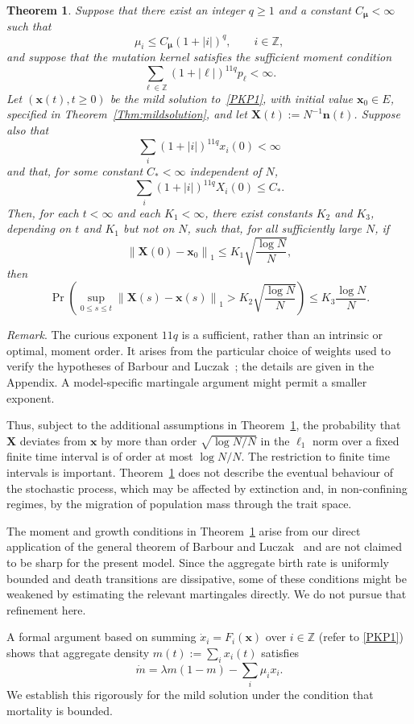 \documentclass[12pt]{article}
\newtheorem{theorem}{Theorem}
\newcommand{\Z}{\ensuremath{\mathbb Z}}
\newcommand{\bn}{\boldsymbol{n}}
\newcommand{\bX}{\boldsymbol{X}}
\newcommand{\bmu}{\boldsymbol{\mu}}
\newcommand{\norm}[1]{\left\lVert #1 \right\rVert}
\newcommand{\bx}{\boldsymbol{x}}
\begin{document}
\begin{theorem}
\label{BL}
Suppose that there exist an integer $q\geq1$ and a constant
$C_{\!\bmu}<\infty$ such that
\[
 \mu_i\leq C_{\!\bmu}(1+|i|)^q,\qquad i\in\mathbb Z,
\]
and suppose that the mutation kernel satisfies the sufficient
moment condition
\[
 \sum_{\ell\in\mathbb Z}(1+|\ell|)^{11q}p_\ell<\infty.
\]
Let $(\bx(t),t\geq0)$ be the mild solution to~\eqref{PKP1}, with
initial value $\bx_0\in E$, specified in
Theorem~\ref{Thm:mildsolution}, and let
$\bX(t):=N^{-1}\bn(t)$. Suppose also that
\[
 \sum_i(1+|i|)^{11q}x_i(0)<\infty
\]
and that, for some constant $C_*<\infty$ independent of $N$,
\[
 \sum_i(1+|i|)^{11q}X_i(0)\leq C_*.
\]
Then, for each $t<\infty$ and each $K_1<\infty$, there exist constants
$K_2$ and $K_3$, depending on $t$ and $K_1$ but not on $N$, such that, 
for all sufficiently large $N$, if
\[
 \norm{\bX(0)-\bx_0}_1
 \leq
 K_1\sqrt{\frac{\log N}{N}},
\]
then
\[
 \Pr\left(
 \sup_{0\leq s\leq t}
 \norm{\bX(s)-\bx(s)}_1
 >
 K_2\sqrt{\frac{\log N}{N}}
 \right)
 \leq
 K_3\frac{\log N}{N}.
\]
\end{theorem}

\medskip
\noindent
\emph{Remark}.
The curious exponent $11q$ is a sufficient, rather than an intrinsic
or optimal, moment order. It arises from the particular choice of
weights used to verify the hypotheses of Barbour and
Luczak~\cite{BL12b}; the details are given in the Appendix. A
model-specific martingale argument might permit a smaller exponent.

\medskip
\noindent
Thus, subject to the additional assumptions in Theorem~\ref{BL}, the
probability that $\bX$ deviates from $\bx$ by more than order
$\sqrt{\log N/N}$ in the $\ell_1$ norm over a fixed finite time interval
is of order at most $\log N/N$. The restriction to finite time intervals
is important. Theorem~\ref{BL} does not describe the eventual behaviour
of the stochastic process, which may be affected by extinction and, in
non-confining regimes, by the migration of population mass through the
trait space.

The moment and growth conditions in Theorem~\ref{BL} arise from our
direct application of the general theorem of Barbour and
Luczak~\cite{BL12b} and are not claimed to be sharp for the present
model. Since the aggregate birth rate is uniformly bounded and death
transitions are dissipative, some of these conditions might be weakened
by estimating the relevant martingales directly. We do not pursue that
refinement here.

\medskip
A formal argument based on summing $\dot x_i = F_i(\bx)$ over $i\in \Z$
(refer to \eqref{PKP1}) shows that aggregate density
$m(t):=\sum_i x_i(t)$ satisfies
\begin{equation}
\dot{m}=\lambda m(1-m) - \sum_i \mu_i x_i.
\label{dmdt}
\end{equation}
We establish this rigorously for the mild solution under the
condition that mortality is bounded.
\end{document}
